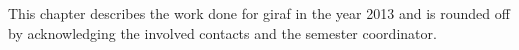 

This chapter describes the work done for \ac{giraf} in the year 2013 and is rounded off by acknowledging the involved contacts and the semester coordinator.